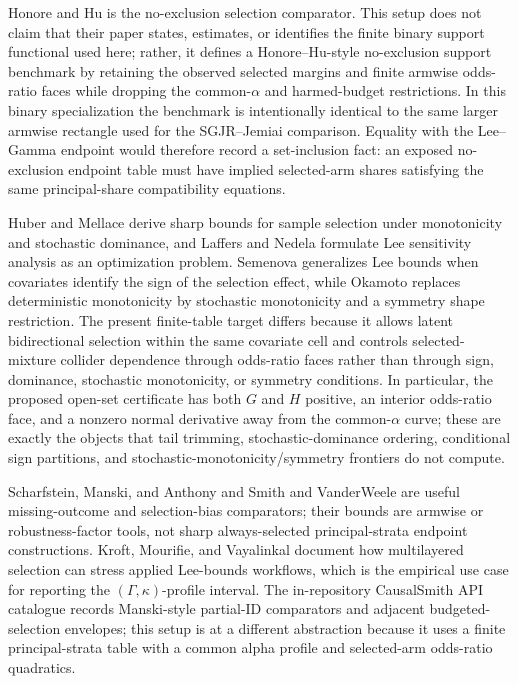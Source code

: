 \documentclass[11pt]{article}
\theoremstyle{definition}
\theoremstyle{plain}
\theoremstyle{remark}
\begin{document}
Honore and Hu \cite{HonoreHu2020Selection} is the no-exclusion selection
comparator.  This setup does not claim that their paper states, estimates, or
identifies the finite binary support functional used here; rather, it defines a
Honore--Hu-style no-exclusion support benchmark by retaining the observed
selected margins and finite armwise odds-ratio faces while dropping the
common-\(\alpha\) and harmed-budget restrictions.  In this binary
specialization the benchmark is intentionally identical to the same larger
armwise rectangle used for the SGJR--Jemiai comparison.  Equality with the
Lee--Gamma endpoint would therefore record a set-inclusion fact: an exposed
no-exclusion endpoint table must have implied selected-arm shares satisfying
the same principal-share compatibility equations.

Huber and Mellace \cite{HuberMellace2015SharpSelection} derive sharp bounds for sample
selection under monotonicity and stochastic dominance, and Laffers and Nedela
\cite{LaffersNedela2017Sensitivity} formulate Lee sensitivity analysis as an optimization
problem.  Semenova \cite{Semenova2025GeneralizedLee} generalizes Lee bounds when covariates
identify the sign of the selection effect, while Okamoto \cite{Okamoto2025RobustifyLee}
replaces deterministic monotonicity by stochastic monotonicity and a symmetry
shape restriction.  The present finite-table target differs because it allows
latent bidirectional selection within the same covariate cell and controls
selected-mixture collider dependence through odds-ratio faces rather than
through sign, dominance, stochastic monotonicity, or symmetry conditions.  In
particular, the proposed open-set certificate has
both \(G\) and \(H\) positive, an interior odds-ratio face, and a nonzero normal
derivative away from the common-\(\alpha\) curve; these are exactly the objects
that tail trimming, stochastic-dominance ordering, conditional sign partitions,
and stochastic-monotonicity/symmetry frontiers do not compute.

Scharfstein, Manski, and Anthony \cite{ScharfsteinManskiAnthony2004} and Smith
and VanderWeele \cite{SmithVanderWeele2019} are useful missing-outcome and
selection-bias comparators; their bounds are armwise or robustness-factor tools,
not sharp always-selected principal-strata endpoint constructions.  Kroft,
Mourifie, and Vayalinkal \cite{KroftMourifieVayalinkal2024} document how
multilayered selection can stress applied Lee-bounds workflows, which is the
empirical use case for reporting the \((\Gamma,\kappa)\)-profile interval.  The
in-repository CausalSmith API catalogue records Manski-style partial-ID
comparators and adjacent budgeted-selection envelopes; this setup is at a
different abstraction because it uses a finite principal-strata table with a
common alpha profile and selected-arm odds-ratio quadratics.
\end{document}
